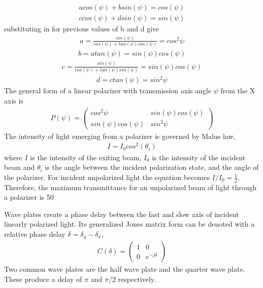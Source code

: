 \begin{align}
    acos(\psi) + bsin(\psi) = cos(\psi) \\
    ccos(\psi) + dsin(\psi) = sin(\psi)
\end{align}
%
substituting in for previous values of b and d give
%
\begin{align}
    a = \frac{cos(\psi)}{cos(\psi) + tan(\psi)sin(\psi)} = cos^2\psi
\end{align}
\begin{align}
    b = atan(\psi) = sin(\psi)cos(\psi)
\end{align}
\begin{align}
    c = \frac{sin(\psi)}{cos(\psi) + tan(\psi)sin(\psi)} = sin(\psi)cos(\psi)
\end{align}
\begin{align}
    d = ctan(\psi) = sin^2\psi
\end{align}
%
The general form of a linear polarizer with transmission axis angle $\psi$ from the X axis is
%
\begin{align}
    P(\psi) =
    \begin{pmatrix}
        cos^2\psi & sin(\psi)cos(\psi) \\
        sin(\psi)cos(\psi) & sin^2\psi
    \end{pmatrix}
\end{align}
%
The intensity of light emerging from a polarizer is governed by Malus law,
%
\begin{align}
    I = I_0cos^2(\theta_i)
\end{align}
%
where $I$ is the intensity of the exiting beam, $I_0$ is the intensity of the incident beam and $\theta_i$ is the angle between the incident polarization state, and the angle of the polarizer.   For incident unpolarized light the equation becomes $I / I_0 = \frac{1}{2}$.  Therefore, the maximum transmittance for an unpolarized beam of light through a polarizer is 50%

Wave plates create a phase delay between the fast and slow axis of incident linearly polarized light.  Its generalized Jones matrix form can be denoted with a relative phase delay $\delta=\delta_y-\delta_x$,
\begin{align}
    C(\delta) =
    \begin{pmatrix}
        1 & 0 \\
        0 & e^{-j\delta}
    \end{pmatrix}
\end{align}
%
Two common wave plates are the half wave plate and the quarter wave plate.  These produce a delay of $\pi$ and $\pi/2$ respectively.

